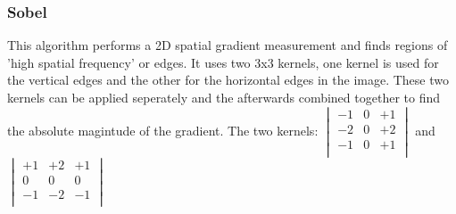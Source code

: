 \documentclass[12pt]{article}
\begin{document}
\subsubsection{Sobel}
 This algorithm performs a 2D spatial gradient measurement and finds regions of 'high spatial frequency' or edges. It uses two 3x3 kernels, one kernel is used for the vertical edges and the other for the horizontal edges in the image. These two kernels can be applied seperately and the afterwards combined together to find the absolute magintude of the gradient.
 \newline
 \newline
 The two kernels: 
 $\begin{vmatrix}
	-1 & 0 & +1\\
	-2 & 0 & +2\\
	-1 & 0 & +1\\
\end{vmatrix}$
and
$\begin{vmatrix}
	+1 & +2 & +1\\
	0 & 0 & 0\\
	-1 & -2 & -1\\
\end{vmatrix}$
\end{document}
